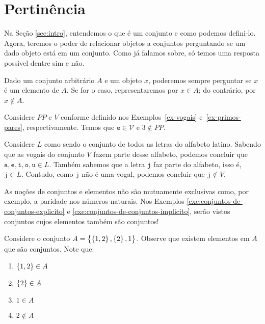 \section{Pertinência}

Na Seção \ref{sec:intro}, entendemos o que é um conjunto e como podemos defini-lo.
Agora, teremos o poder de relacionar objetos a conjuntos perguntando se um dado objeto está em um conjunto.
Como já falamos sobre, só temos uma resposta possível dentre sim e não.

\begin{definition}
\label{def:in}
Dado um conjunto arbitrário $A$ e um objeto $x$,
poderemos sempre perguntar se $x$ é um elemento de $A$. Se for o caso, representaremos por $x \in A$; do contrário, por $x \notin A$.
\end{definition}

\begin{example}
Considere $PP$ e $V$ conforme definido nos Exemplos~\ref{ex-vogais} e~\ref{ex-primos-pares}, respectivamente. Temos que $\texttt{e} \in \mathcal{V}$ e $3 \notin PP$.
\end{example}

\begin{example}
Considere $L$ como sendo o conjunto de todos as letras do alfabeto latino.
Sabendo que as vogais do conjunto $V$ fazem parte desse alfabeto, podemos concluir que $\texttt{a}, \texttt{e}, \texttt{i}, \texttt{o}, \texttt{u} \in L$.
Também sabemos que a letra $\texttt{j}$ faz parte do alfabeto, isso é, $\texttt{j} \in L$.
Contudo, como $\texttt{j}$ não é uma vogal, podemos concluir que $\texttt{j} \notin V$.

\end{example}

As noções de conjuntos e elementos não são mutuamente exclusivas como, por exemplo, a paridade nos números naturais. 
Nos Exemplos \ref{exe:conjuntos-de-conjuntos-explicito} e \ref{exe:conjuntos-de-conjuntos-implicito}, serão vistos conjuntos cujos elementos também são conjuntos!

\begin{example}
\label{exe:conjuntos-de-conjuntos-explicito}
Considere o conjunto $A = \left\{ \left\{ 1,2\right\},\left\{ 2\right\}, 1\right\}$.
    Observe que existem elementos em $A$ que são conjuntos.
    Note que:
    \begin{enumerate}
        \item $\left\{ 1,2\right\} \in A$
        \item $\left\{ 2\right\} \in A$
        \item $1 \in A$
        \item $2 \notin A$
    \end{enumerate}
\end{example}

